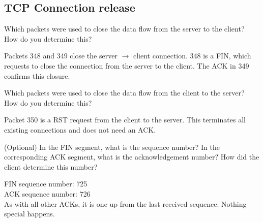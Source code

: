 \subsection{TCP Connection release}
\begin{Question}
	Which packets were used to close the data flow from the server to the client? How do you determine this?
\end{Question}
\begin{Answer}
	Packets 348 and 349 close the server $\rightarrow$ client connection.
	348 is a FIN, which requests to close the connection from the server to the client.
	The ACK in 349 confirms this closure.
\end{Answer}

\begin{Question}
	Which packets were used to close the data flow from the client to the server? How do you determine this?
\end{Question}
\begin{Answer}
	Packet 350 is a RST request from the client to the server.
	This terminates all existing connections and does not need an ACK.
\end{Answer}

\begin{Question}
	(Optional) In the FIN segment, what is the sequence number? In the corresponding ACK segment, what is the acknowledgement number? How did the client determine this number?
\end{Question}
\begin{Answer}
	FIN sequence number: 725 \\
	ACK sequence number: 726 \\
	As with all other ACKs, it is one up from the last received sequence.
	Nothing special happens.
\end{Answer}
